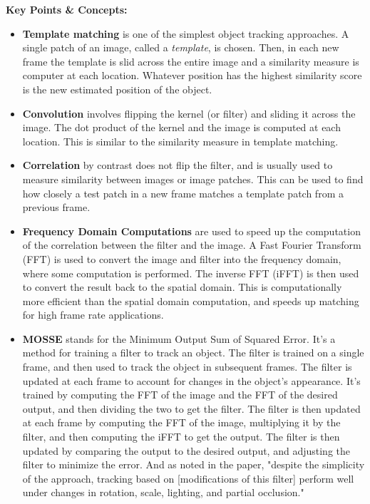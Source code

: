 \documentclass{article}
\begin{document}
\vspace{0.3cm}

\textbf{Key Points \& Concepts:}
\begin{itemize}
  \item \textbf{Template matching} is one of the simplest object tracking approaches. A single patch of an image, called a \emph{template}, is chosen. Then, in each new frame the template is slid across the entire image and a similarity measure is computer at each location. Whatever position has the highest similarity score is the new estimated position of the object. 
  \item \textbf{Convolution} involves flipping the kernel (or filter) and sliding it across the image. The dot product of the kernel and the image is computed at each location. This is similar to the similarity measure in template matching.
  \item \textbf{Correlation} by contrast does not flip the filter, and is usually used to measure similarity between images or image patches. This can be used to find how closely a test patch in a new frame matches a template patch from a previous frame.
  \item \textbf{Frequency Domain Computations} are used to speed up the computation of the correlation between the filter and the image. A Fast Fourier Transform (FFT) is used to convert the image and filter into the frequency domain, where some computation is performed. The inverse FFT (iFFT) is then used to convert the result back to the spatial domain. This is computationally more efficient than the spatial domain computation, and speeds up matching for high frame rate applications.
  \item \textbf{MOSSE} stands for the Minimum Output Sum of Squared Error. It's a method for training a filter to track an object. The filter is trained on a single frame, and then used to track the object in subsequent frames. The filter is updated at each frame to account for changes in the object's appearance. It's trained by computing the FFT of the image and the FFT of the desired output, and then dividing the two to get the filter. The filter is then updated at each frame by computing the FFT of the image, multiplying it by the filter, and then computing the iFFT to get the output. The filter is then updated by comparing the output to the desired output, and adjusting the filter to minimize the error. And as noted in the paper, "despite the simplicity of the approach, tracking based on [modifications of this filter] perform well under changes in rotation, scale, lighting, and partial occlusion."
\end{itemize}
\end{document}
